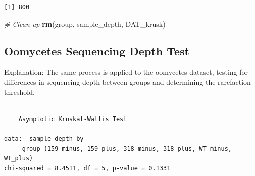 \documentclass[
  11pt,
]{article}
\newenvironment{Shaded}{\begin{snugshade}}{\end{snugshade}}
\newcommand{\AttributeTok}[1]{\textcolor[rgb]{0.13,0.29,0.53}{#1}}
\newcommand{\CommentTok}[1]{\textcolor[rgb]{0.56,0.35,0.01}{\textit{#1}}}
\newcommand{\FunctionTok}[1]{\textcolor[rgb]{0.13,0.29,0.53}{\textbf{#1}}}
\newcommand{\NormalTok}[1]{#1}
\newcommand{\OtherTok}[1]{\textcolor[rgb]{0.56,0.35,0.01}{#1}}
\newcommand{\SpecialCharTok}[1]{\textcolor[rgb]{0.81,0.36,0.00}{\textbf{#1}}}
\newcommand{\StringTok}[1]{\textcolor[rgb]{0.31,0.60,0.02}{#1}}
\begin{document}
\begin{verbatim}
[1] 800
\end{verbatim}

\begin{Shaded}
\begin{Highlighting}[]
\CommentTok{\# Clean up}
\FunctionTok{rm}\NormalTok{(group, sample\_depth, DAT\_krusk)}
\end{Highlighting}
\end{Shaded}

\subsection{Oomycetes Sequencing Depth
Test}\label{oomycetes-sequencing-depth-test}

Explanation: The same process is applied to the oomycetes dataset,
testing for differences in sequencing depth between groups and
determining the rarefaction threshold.

\begin{Shaded}
\end{Shaded}

\begin{verbatim}

    Asymptotic Kruskal-Wallis Test

data:  sample_depth by
     group (159_minus, 159_plus, 318_minus, 318_plus, WT_minus, WT_plus)
chi-squared = 8.4511, df = 5, p-value = 0.1331
\end{verbatim}
\end{document}
